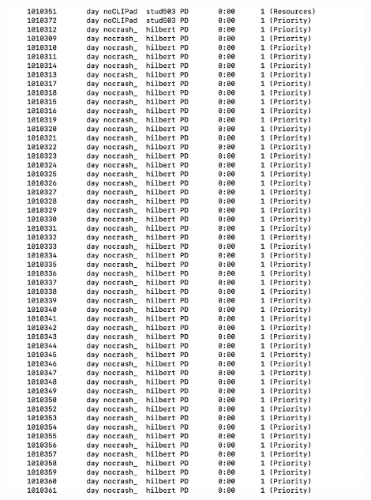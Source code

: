 \documentclass[
	11pt, %
	aspectratio=169, %
]{beamer}
\begin{document}
\begin{frame}[plain] %
	\begin{center}
		\includegraphics[width=12cm]{figures/hilbertDOS.png}
	\end{center}
\end{frame}
\end{document}
